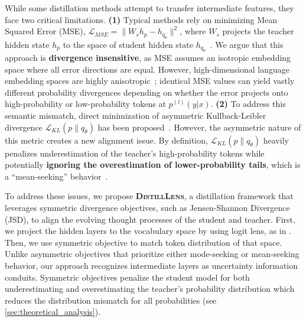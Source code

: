 \documentclass{article}
\theoremstyle{plain}
\theoremstyle{definition}
\theoremstyle{remark}
\begin{document}
While some distillation methods attempt to transfer intermediate features, they face two critical limitations.
\textbf{(1)} Typical methods rely on minimizing Mean Squared Error (MSE), $\mathcal{L}_{MSE} = \|W_s h_p - h_{q_\theta}\|^2$, where $W_s$ projects the teacher hidden state $h_p$ to the space of student hidden state $h_{q_\theta}$~\cite{romero2014fitnets,jiao2021improving}.
We argue that this approach is \textbf{divergence insensitive}, as MSE assumes an isotropic embedding space where all error directions are equal.
However, high-dimensional language embedding spaces are highly anisotropic~\cite{ethayarajh2019contextual}; identical MSE values can yield vastly different probability divergences depending on whether the error projects onto high-probability or low-probability tokens at $p^{(l)} (y | x)$.
\textbf{(2)} To address this semantic mismatch, direct minimization of asymmetric Kullback-Leibler divergence $\mathcal{L}_{KL}(p\|q_\theta)$ has been proposed~\cite{sun2019patient,gong2025beyond}.
However, the asymmetric nature of this metric creates a new alignment issue.
By definition, $\mathcal{L}_{KL}(p\|q_\theta)$ heavily penalizes underestimation of the teacher's high-probability tokens while potentially \textbf{ignoring the overestimation of lower-probability tails}, which is a ``mean-seeking'' behavior~\cite{wu2024rethinking}. 


To address these issues, we propose \textbf{\textsc{DistillLens}}, a distillation framework that leverages symmetric divergence objectives, such as Jensen-Shannon Divergence (JSD), to align the evolving thought processes of the student and teacher.
First, we project the hidden layers to the vocabulary space by using logit lens, as in .
Then, we use symmetric objective to match token distribution of that space. 
Unlike asymmetric objectives that prioritize either mode-seeking or mean-seeking behavior, our approach recognizes intermediate layers as uncertainty information conduits.
Symmetric objectives penalize the student model for both underestimating and overestimating the teacher's probability distribution which reduces the distribution mismatch for all probabilities (see \cref{sec:theoretical_analysis}).
\end{document}

